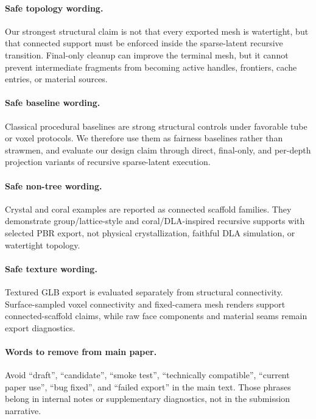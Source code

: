\paragraph{Safe topology wording.}
Our strongest structural claim is not that every exported mesh is watertight,
but that connected support must be enforced inside the sparse-latent recursive
transition. Final-only cleanup can improve the terminal mesh, but it cannot
prevent intermediate fragments from becoming active handles, frontiers, cache
entries, or material sources.

\paragraph{Safe baseline wording.}
Classical procedural baselines are strong structural controls under favorable
tube or voxel protocols. We therefore use them as fairness baselines rather
than strawmen, and evaluate our design claim through direct, final-only, and
per-depth projection variants of recursive sparse-latent execution.

\paragraph{Safe non-tree wording.}
Crystal and coral examples are reported as connected scaffold families. They
demonstrate group/lattice-style and coral/DLA-inspired recursive supports with
selected PBR export, not physical crystallization, faithful DLA simulation, or
watertight topology.

\paragraph{Safe texture wording.}
Textured GLB export is evaluated separately from structural connectivity.
Surface-sampled voxel connectivity and fixed-camera mesh renders support
connected-scaffold claims, while raw face components and material seams remain
export diagnostics.

\paragraph{Words to remove from main paper.}
Avoid ``draft'', ``candidate'', ``smoke test'', ``technically compatible'',
``current paper use'', ``bug fixed'', and ``failed export'' in the main text.
Those phrases belong in internal notes or supplementary diagnostics, not in the
submission narrative.
